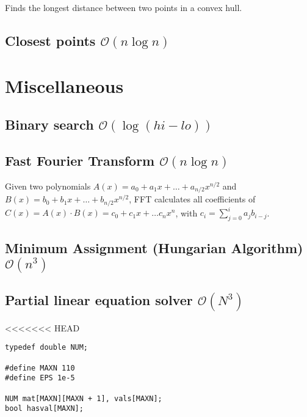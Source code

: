\documentclass[8pt,a4paper,landscape,oneside]{amsart}
\begin{document}
\begin{multicols*}{3}
Finds the longest distance between two points in a convex hull.



\subsection{Closest points $\mathcal{O}(n \log n)$}



\section{Miscellaneous}
\subsection{Binary search $\mathcal{O}(\log (hi - lo))$}



\subsection{Fast Fourier Transform $\mathcal{O}(n \log n)$}

Given two polynomials $A(x) = a_0 + a_1 x + \dots + a_{n/2} x^{n/2}$ and $B(x) = b_0 + b_1 x + \dots + b_{n/2} x^{n/2}$, FFT calculates all coefficients of $C(x) = A(x) \cdot B(x) = c_0 + c_1 x + \dots c_{n} x^{n}$, with $c_i = \sum_{j=0}^{i} a_j b_{i-j}$.



\subsection{Minimum Assignment (Hungarian Algorithm) $\mathcal{O}(n^{3})$}



\subsection{Partial linear equation solver $\mathcal{O}(N^3)$}

<<<<<<< HEAD
\begin{lstlisting}
typedef double NUM;

#define MAXN 110
#define EPS 1e-5

NUM mat[MAXN][MAXN + 1], vals[MAXN];
bool hasval[MAXN];


\end{lstlisting}
\end{multicols*}
\end{document}
